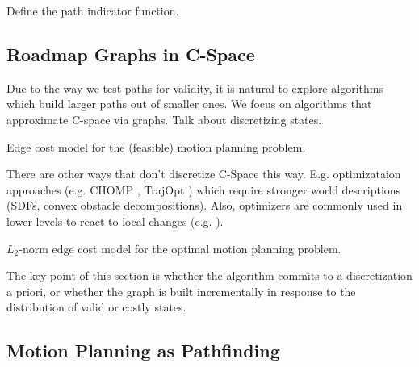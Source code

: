 Define the path indicator function.

\subsection{Roadmap Graphs in C-Space}

Due to the way we test paths for validity,
it is natural to explore algorithms which build larger paths
out of smaller ones.
We focus on algorithms that approximate C-space via graphs.
Talk about discretizing states.

\begin{marginfigure}
   \centering
   \caption{Edge cost model
      for the (feasible) motion planning problem.}
\end{marginfigure}

There are other ways that don't discretize C-Space this way.
E.g. optimizataion approaches
(e.g. CHOMP \citep{zucker2013chomp},
TrajOpt \citep{schulman2013trajopt})
which require stronger world descriptions
(SDFs, convex obstacle decompositions).
Also,
optimizers are commonly used in lower levels to react to local
changes (e.g. \citep{quinlan1994modification}).

\begin{marginfigure}
   \centering
   \caption{$L_2$-norm edge cost model
      for the optimal motion planning problem.}
\end{marginfigure}

The key point of this section is whether the algorithm commits to
a discretization a priori,
or whether the graph is built incrementally in response to the
distribution of valid or costly states.

\subsection{Motion Planning as Pathfinding}
\label{subsec:roadmaps:planning-as-pathfinding}

